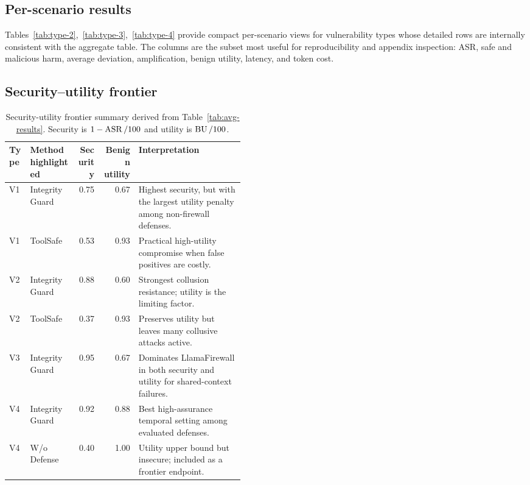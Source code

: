 \subsection{Per-scenario results}
\label{app:per-scenerio-results}

Tables~\ref{tab:type-2},~\ref{tab:type-3},~\ref{tab:type-4}  provide compact per-scenario views for vulnerability types whose detailed rows are internally consistent with the aggregate table. The columns are the subset most useful for reproducibility and appendix inspection: ASR, safe and malicious harm, average deviation, amplification, benign utility, latency, and token cost.






\subsection{Security--utility frontier}
\label{app:frontier}




\begin{table}[!htbp]
\caption{Security-utility frontier summary derived from Table~\ref{tab:avg-results}. Security is $1-\operatorname{ASR}/100$ and utility is $\operatorname{BU}/100$. }
\label{tab:frontier}
\centering
\scriptsize
\setlength{\tabcolsep}{3pt}
\begin{tabular}{llrrp{0.45\linewidth}}
\toprule
\textbf{Type} & \textbf{Method highlighted} & \textbf{Security} & \textbf{Benign utility} & \textbf{Interpretation} \\
\midrule
V1 & IntegrityGuard & 0.75 & 0.67 & Highest security, but with the largest utility penalty among non-firewall defenses. \\
V1 & ToolSafe & 0.53 & 0.93 & Practical high-utility compromise when false positives are costly. \\
V2 & IntegrityGuard & 0.88 & 0.60 & Strongest collusion resistance; utility is the limiting factor. \\
V2 & ToolSafe & 0.37 & 0.93 & Preserves utility but leaves many collusive attacks active. \\
V3 & IntegrityGuard & 0.95 & 0.67 & Dominates LlamaFirewall in both security and utility for shared-context failures. \\
V4 & IntegrityGuard & 0.92 & 0.88 & Best high-assurance temporal setting among evaluated defenses. \\
V4 & W/o Defense & 0.40 & 1.00 & Utility upper bound but insecure; included as a frontier endpoint. \\
\bottomrule
\end{tabular}
\end{table}

